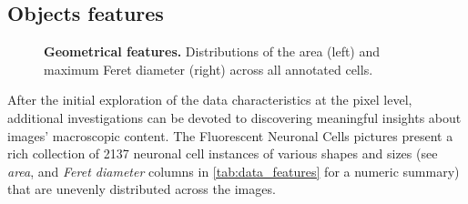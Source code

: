 \subsection{Objects features}
\begin{figure}
    \centering
    \caption{\textbf{Geometrical features.} Distributions of the area (left) and maximum Feret diameter (right) across all annotated cells.}
    \label{fig:dataset:geom}
\end{figure}
After the initial exploration of the data characteristics at the pixel level, additional investigations can be devoted to discovering meaningful insights about images' macroscopic content.
The Fluorescent Neuronal Cells pictures present a rich collection of 2137 neuronal cell instances of various shapes and sizes (see \textit{area}, and \textit{Feret diameter} columns in \cref{tab:data_features} for a numeric summary) that are unevenly distributed across the images.

